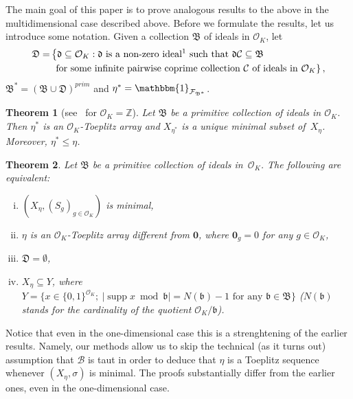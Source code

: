 \documentclass[leqno,a4paper,12pt]{article}
\newtheorem{Thx}{Theorem}
\theoremstyle{definition}
\newcommand{\Z}{{\mathbb{Z}}}
\newcommand{\OK}{\mathcal{O}_K}
\newcommand{\raz}{\mathbbm{1}}
\begin{document}
The main goal of this paper is to prove analogous results to the above in the multidimensional case described above. Before we  formulate the results, let us introduce some notation. Given a collection  $\mathfrak{B}$ of ideals in $\OK$, let
\begin{align}
\begin{split}\label{A}
\mathfrak{D}=&\left\{\mathfrak{d}\subseteq \OK : \mathfrak{d} \text{ is a non-zero ideal\footnotemark{} such that }\mathfrak{d}\mathcal{C}\subseteq\mathfrak{B}\right.\\
&\left.\text{ for some infinite pairwise coprime collection $\mathcal{C}$ of ideals in }\OK\right\},
\end{split}
\end{align}
\footnotetext{The ideal $\mathfrak{d}$ can be equal to $\OK$.}
$\mathfrak{B}^*=(\mathfrak{B}\cup \mathfrak{D})^{prim}$ and $\eta^*=\raz_{\mathcal{F}_{\mathfrak{B}^*}}$.
\begin{Thx}[{see~\cite[Corollary 5]{MR4280951} for $\OK=\Z$}]\label{minimal2}
Let $\mathfrak{B}$ be a primitive collection of ideals in $\OK$. Then $\eta^*$ is an $\OK$-Toeplitz array and $X_{\eta^*}$ is a unique minimal subset of~$X_\eta$. Moreover, $\eta^*\leq\eta$.
\end{Thx}
\begin{Thx}\label{equivalent}
Let $\mathfrak{B}$ be a primitive collection of ideals in~$\OK$. The following are equivalent:
\begin{enumerate}[(i)]
\item $(X_\eta,(S_g)_{g\in\OK})$ is minimal,\label{min}
\item $\eta$ is an $\OK$-Toeplitz array different from $\mathbf{0}$, where $\mathbf{0}_g=0$ for any $g\in\mathcal{O}_K$,\label{top}
\item $\mathfrak{D}=\emptyset$,\label{arith}
\item $X_\eta\subseteq Y$, where $Y=\{x\in\{0,1\}^{\OK};\ |\operatorname{supp }x \bmod \mathfrak{b}|=N(\mathfrak{b})-1\text{ for any }\mathfrak{b}\in\mathfrak{B}\}$ ($N(\mathfrak{b})$ stands for the cardinality of the quotient $\OK/\mathfrak{b}$).\label{Y}
\end{enumerate}
\end{Thx}

Notice that even in the one-dimensional case this is a strenghtening of the earlier results. Namely, our methods allow us to skip the technical (as it turns out) assumption that $\mathscr{B}$ is taut in order to deduce that $\eta$ is a Toeplitz sequence whenever $(X_\eta,\sigma)$ is minimal. The proofs substantially differ from the earlier ones, even in the one-dimensional case.
\end{document}
